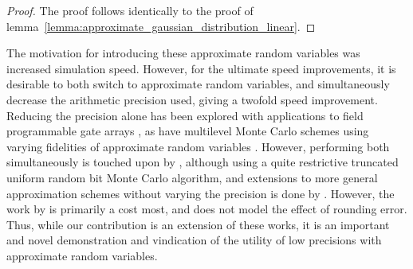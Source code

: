 \documentclass[manuscript,review]{acmart}
\begin{document}
\begin{proof}
The proof follows identically to the proof of lemma~\ref{lemma:approximate_gaussian_distribution_linear}. \qedhere
\end{proof}

The motivation for introducing these approximate random variables was increased simulation speed. However, for the ultimate speed improvements, it is desirable to both switch to approximate random variables, and simultaneously decrease the arithmetic precision used, giving a twofold speed improvement. Reducing the precision alone has been explored with applications to field programmable gate arrays  \citep{brugger2014mixed,omland2015exploiting,omland2016mixed,chow2012mixed}, as have multilevel Monte Carlo schemes using varying fidelities of approximate random variables \citep{muller1958inverse}. However, performing both simultaneously is touched upon by \citet{giles2019random_multilevel}, although using a quite restrictive truncated uniform random bit Monte Carlo algorithm, and extensions to more general approximation schemes without varying the precision is done by \citet{giles2020approximate}. However, the work by \citet{giles2019random_multilevel} is primarily a cost most, and does not model the effect of rounding error. Thus, while our contribution is an extension of these works, it is an important and novel demonstration and vindication of the utility of low precisions with approximate random variables. 
\end{document}
